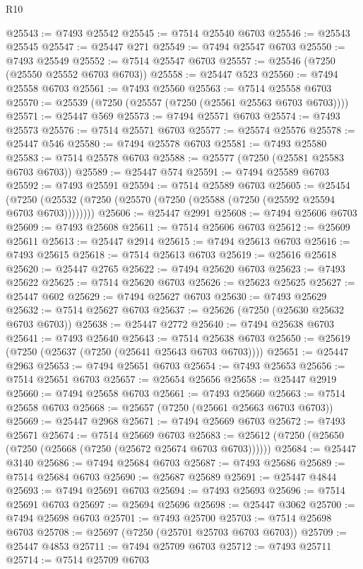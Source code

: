 \begin{lexlean}{R10}
\begin{coremodule}
{{{{{{{{{{{{{{{{{{{{{{{{{{{{{{{{{{{{{{{{{{{{{{{{{{{{{{{{{{{{{{{{{{{{{{{{{{{{{{{{{{{{@25543 := @7493 @25542
@25545 := @7514 @25540 @6703
@25546 := @25543 @25545
@25547 := @25447 @271
@25549 := @7494 @25547 @6703
@25550 := @7493 @25549
@25552 := @7514 @25547 @6703
@25557 := @25546 (@7250 (@25550 @25552 @6703 @6703))
@25558 := @25447 @523
@25560 := @7494 @25558 @6703
@25561 := @7493 @25560
@25563 := @7514 @25558 @6703
@25570 := @25539 (@7250 (@25557 (@7250 (@25561 @25563 @6703 @6703))))
@25571 := @25447 @569
@25573 := @7494 @25571 @6703
@25574 := @7493 @25573
@25576 := @7514 @25571 @6703
@25577 := @25574 @25576
@25578 := @25447 @546
@25580 := @7494 @25578 @6703
@25581 := @7493 @25580
@25583 := @7514 @25578 @6703
@25588 := @25577 (@7250 (@25581 @25583 @6703 @6703))
@25589 := @25447 @574
@25591 := @7494 @25589 @6703
@25592 := @7493 @25591
@25594 := @7514 @25589 @6703
@25605 := @25454
    (@7250 (@25532 (@7250 (@25570 (@7250 (@25588 (@7250 (@25592 @25594 @6703 @6703))))))))
@25606 := @25447 @2991
@25608 := @7494 @25606 @6703
@25609 := @7493 @25608
@25611 := @7514 @25606 @6703
@25612 := @25609 @25611
@25613 := @25447 @2914
@25615 := @7494 @25613 @6703
@25616 := @7493 @25615
@25618 := @7514 @25613 @6703
@25619 := @25616 @25618
@25620 := @25447 @2765
@25622 := @7494 @25620 @6703
@25623 := @7493 @25622
@25625 := @7514 @25620 @6703
@25626 := @25623 @25625
@25627 := @25447 @602
@25629 := @7494 @25627 @6703
@25630 := @7493 @25629
@25632 := @7514 @25627 @6703
@25637 := @25626 (@7250 (@25630 @25632 @6703 @6703))
@25638 := @25447 @2772
@25640 := @7494 @25638 @6703
@25641 := @7493 @25640
@25643 := @7514 @25638 @6703
@25650 := @25619 (@7250 (@25637 (@7250 (@25641 @25643 @6703 @6703))))
@25651 := @25447 @2963
@25653 := @7494 @25651 @6703
@25654 := @7493 @25653
@25656 := @7514 @25651 @6703
@25657 := @25654 @25656
@25658 := @25447 @2919
@25660 := @7494 @25658 @6703
@25661 := @7493 @25660
@25663 := @7514 @25658 @6703
@25668 := @25657 (@7250 (@25661 @25663 @6703 @6703))
@25669 := @25447 @2968
@25671 := @7494 @25669 @6703
@25672 := @7493 @25671
@25674 := @7514 @25669 @6703
@25683 := @25612 (@7250 (@25650 (@7250 (@25668 (@7250 (@25672 @25674 @6703 @6703))))))
@25684 := @25447 @3140
@25686 := @7494 @25684 @6703
@25687 := @7493 @25686
@25689 := @7514 @25684 @6703
@25690 := @25687 @25689
@25691 := @25447 @4844
@25693 := @7494 @25691 @6703
@25694 := @7493 @25693
@25696 := @7514 @25691 @6703
@25697 := @25694 @25696
@25698 := @25447 @3062
@25700 := @7494 @25698 @6703
@25701 := @7493 @25700
@25703 := @7514 @25698 @6703
@25708 := @25697 (@7250 (@25701 @25703 @6703 @6703))
@25709 := @25447 @4853
@25711 := @7494 @25709 @6703
@25712 := @7493 @25711
@25714 := @7514 @25709 @6703
}}}}}}}}}}}}}}}}}}}}}}}}}}}}}}}}}}}}}}}}}}}}}}}}}}}}}}}}}}}}}}}}}}}}}}}}}}}}}}}}}}}}
\end{coremodule}
\end{lexlean}
